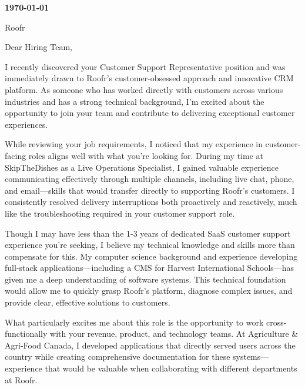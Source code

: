 \documentclass{article}
\begin{document}
    \pagestyle{empty}
    \doublespacing

    

    \noindent
    \textbf{\today}

    \noindent
    Roofr

    \noindent
    Dear Hiring Team,

    \vspace{1em}

    \noindent
    I recently discovered your Customer Support Representative position and was immediately drawn to Roofr's customer-obsessed approach and innovative CRM platform. As someone who has worked directly with customers across various industries and has a strong technical background, I'm excited about the opportunity to join your team and contribute to delivering exceptional customer experiences.


    \vspace{1em}

    \noindent
    While reviewing your job requirements, I noticed that my experience in customer-facing roles aligns well with what you're looking for. During my time at SkipTheDishes as a Live Operations Specialist, I gained valuable experience communicating effectively through multiple channels, including live chat, phone, and email—skills that would transfer directly to supporting Roofr's customers. I consistently resolved delivery interruptions both proactively and reactively, much like the troubleshooting required in your customer support role.


    \vspace{1em}

    \noindent
    Though I may have less than the 1-3 years of dedicated SaaS customer support experience you're seeking, I believe my technical knowledge and skills more than compensate for this. My computer science background and experience developing full-stack applications—including a CMS for Harvest International Schools—has given me a deep understanding of software systems. This technical foundation would allow me to quickly grasp Roofr's platform, diagnose complex issues, and provide clear, effective solutions to customers.


    \vspace{1em}

    \noindent
    What particularly excites me about this role is the opportunity to work cross-functionally with your revenue, product, and technology teams. At Agriculture \& Agri-Food Canada, I developed applications that directly served users across the country while creating comprehensive documentation for these systems—experience that would be valuable when collaborating with different departments at Roofr.
\end{document}
